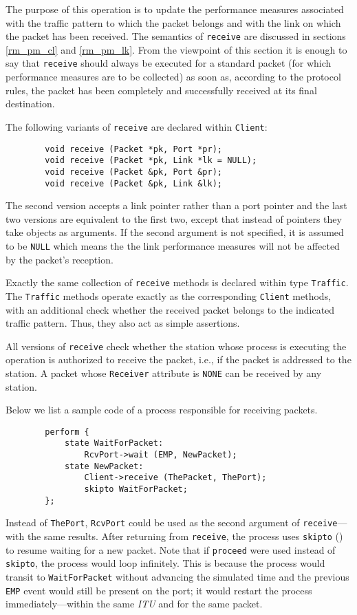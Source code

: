 \noindent
The purpose of this operation is to update the
performance measures associated
with the traffic pattern to which the packet belongs and with the link on which
the packet has been received.
The semantics of {\tt receive} are discussed
in sections \ref{rm_pm_cl} and \ref{rm_pm_lk}.
From the viewpoint of this section it is enough to say that {\tt receive}
should always be executed for a standard packet (for which performance measures
are to be collected) as soon as, according to the protocol rules, the
packet has been completely and successfully received at its final destination.

The following variants of {\tt receive} are declared within {\tt Client}:
\begin{verbatim}
        void receive (Packet *pk, Port *pr);
        void receive (Packet *pk, Link *lk = NULL);
        void receive (Packet &pk, Port &pr);
        void receive (Packet &pk, Link &lk);
\end{verbatim}

The second version accepts a link pointer rather than a port pointer and the
last two versions are equivalent to the first two, except that instead
of pointers they take objects as arguments.
If the second argument is not specified, it is assumed to be
{\tt NULL} which means the the link performance measures will not be affected
by the packet's reception.

Exactly the same collection of {\tt receive} methods is declared within
type {\tt Traffic}.
The {\tt Traffic} methods operate exactly as the corresponding {\tt Client}
methods, with an additional check whether the received packet belongs to
the indicated traffic pattern.
Thus, they also act as simple assertions.

All versions of {\tt receive} check whether
the station whose process is executing
the operation is authorized to receive the packet, i.e., if the packet is
addressed to the station.
A packet whose {\tt Receiver} attribute is {\tt NONE} can be received by any
station.

Below we list a sample code of a process responsible for receiving packets.
\begin{verbatim}
        perform {
            state WaitForPacket:
                RcvPort->wait (EMP, NewPacket);
            state NewPacket:
                Client->receive (ThePacket, ThePort);
                skipto WaitForPacket;
        };
\end{verbatim}

Instead of {\tt ThePort}, {\tt RcvPort} could be used as the second
argument of {\tt receive}---with the same results.
After returning from {\tt receive}, the process uses {\tt skipto}
() to resume waiting for a new packet.
Note that if {\tt proceed} were used instead
of {\tt skipto}, the process would loop infinitely.
This is because the process would transit 
to {\tt WaitForPacket} without advancing
the simulated time and the previous
{\tt EMP} event would still be present on the port; it would
restart the process immediately---within the same {\em ITU\/}
and for the same packet.

